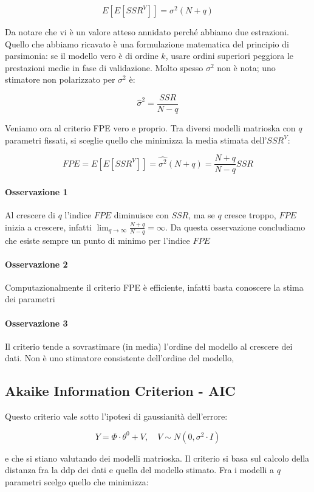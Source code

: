    \[ E[E[SSR^V]]=\sigma^2(N+q) \]

Da notare che vi è un valore atteso annidato perché abbiamo due estrazioni. Quello che abbiamo ricavato è una formulazione matematica del principio di parsimonia: se il modello vero è di ordine $k$, usare ordini superiori peggiora le prestazioni medie in fase di validazione. Molto spesso $\sigma^2$ non è nota; uno stimatore non polarizzato per $\sigma^2$ è:

    \[ \hat{\sigma}^2=\frac{SSR}{N-q} \]

Veniamo ora al criterio FPE vero e proprio. Tra diversi modelli matrioska con $q$ parametri fissati, si sceglie quello che minimizza la media stimata dell'$SSR^V$:

    \[ FPE=E[E[SSR^V]]=\hat{\sigma^2}(N+q)=\frac{N+q}{N-q}SSR \]

\paragraph{Osservazione 1} Al crescere di $q$ l'indice $FPE$ diminuisce con $SSR$, ma se $q$ cresce troppo, $FPE$ inizia a crescere, infatti $\lim_{q\rightarrow\infty}{\frac{N+q}{N-q}}=\infty$. Da questa osservazione concludiamo che esiste sempre un punto di minimo per l'indice $FPE$
\paragraph{Osservazione 2} Computazionalmente il criterio FPE è efficiente, infatti basta conoscere la stima dei parametri
\paragraph{Osservazione 3} Il criterio tende a sovrastimare (in media) l'ordine del modello al crescere dei dati. Non è uno stimatore consistente dell'ordine del modello,
\subsection{Akaike Information Criterion - AIC}
Questo criterio vale sotto l'ipotesi di gaussianità dell'errore:

    \[ Y=\Phi\cdot\theta^0+V, \quad  V\sim N(0,\sigma^2\cdot I) \]

e che si stiano valutando dei modelli matrioska. Il criterio si basa sul calcolo della distanza fra la ddp dei dati e quella del modello stimato. Fra i modelli a $q$ parametri scelgo quello che minimizza:

